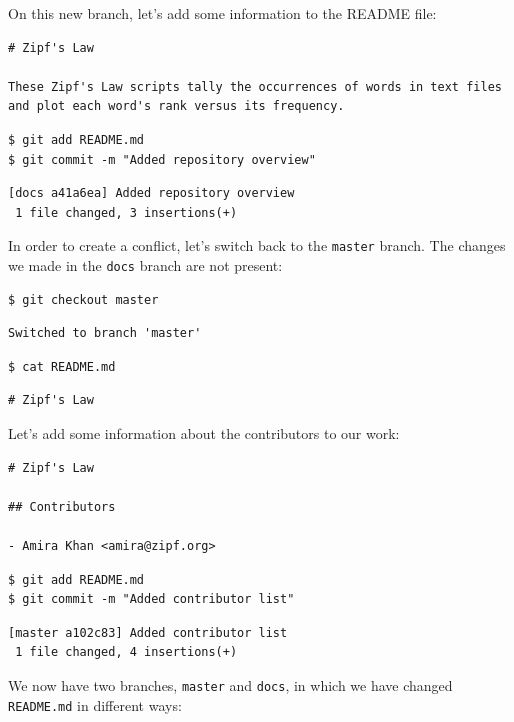 \documentclass[
]{krantz}
\begin{document}
On this new branch,
let's add some information to the README file:

\begin{verbatim}
# Zipf's Law

These Zipf's Law scripts tally the occurrences of words in text files
and plot each word's rank versus its frequency.
\end{verbatim}

\begin{verbatim}
$ git add README.md
$ git commit -m "Added repository overview"
\end{verbatim}

\begin{verbatim}
[docs a41a6ea] Added repository overview
 1 file changed, 3 insertions(+)
\end{verbatim}

In order to create a conflict,
let's switch back to the \texttt{master} branch.
The changes we made in the \texttt{docs} branch are not present:

\begin{verbatim}
$ git checkout master
\end{verbatim}

\begin{verbatim}
Switched to branch 'master'
\end{verbatim}

\begin{verbatim}
$ cat README.md
\end{verbatim}

\begin{verbatim}
# Zipf's Law
\end{verbatim}

Let's add some information about the contributors to our work:

\begin{verbatim}
# Zipf's Law

## Contributors

- Amira Khan <amira@zipf.org>
\end{verbatim}

\begin{verbatim}
$ git add README.md
$ git commit -m "Added contributor list"
\end{verbatim}

\begin{verbatim}
[master a102c83] Added contributor list
 1 file changed, 4 insertions(+)
\end{verbatim}

We now have two branches,
\texttt{master} and \texttt{docs},
in which we have changed \texttt{README.md} in different ways:
\end{document}
